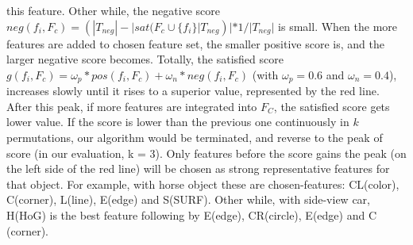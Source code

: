 this feature. Other while, the negative score $neg(f_i,F_c) = (|T_{neg}| - |sat(F_c \cup \{f_i\}|T_{neg})| * 1/|T_{neg}|$ is small. When the more features are
added to chosen feature set, the smaller positive score is, and the
larger negative score becomes. Totally, the satisfied score $g(f_i,F_c) = \omega_p * pos(f_i,F_c) + \omega_n * neg(f_i,F_c)$ (with $\omega_p = 0.6$ and $\omega_n = 0.4$), increases
slowly until it rises to a superior value, represented by the red line. After
this peak, if more features are integrated into $F_C$, the satisfied score
gets lower value.
If the score is lower than the previous one continuously in $k$ permutations, our algorithm would be terminated, and reverse to the peak of score (in our
evaluation, k = 3). Only features before the score gains the peak (on the left side of the red line) will be chosen as strong representative features for that object. For example, with horse object these are chosen-features: CL(color), C(corner), L(line), E(edge) and S(SURF). Other while, with side-view car, H(HoG) is the best feature following by E(edge), CR(circle), E(edge) and C (corner).








